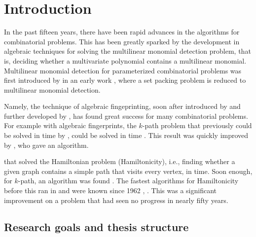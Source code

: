 
\section{Introduction}

In the past fifteen years, 
there have been rapid advances in the algorithms for combinatorial problems. 
This has been greatly sparked by the development in algebraic techniques for solving the 
multilinear monomial detection problem, that is, 
deciding whether a multivariate polynomial contains a multilinear monomial.
Multilinear monomial detection for parameterized combinatorial problems was 
first introduced by \citeauthor{Koutis05} in an early work 
\cite{Koutis05}, where a set packing problem is 
reduced to multilinear monomial detection.

Namely, the technique of algebraic fingeprinting, soon after  
introduced by \citeauthor{Koutis08} \cite{Koutis08} and further developed by 
\citeauthor{Williams09} \cite{Williams09}, 
has found great success for many combinatorial problems. 
For example with algebraic fingerprints, the $k$-path problem 
that previously could be solved in  time by \citeauthor{Chen07} \cite{Chen07}, 
could be solved in  time \cite{Koutis08}. 
This result was quickly improved by \cite{Williams09} \cite{Williams09}, 
who gave an  algorithm.

that solved the Hamiltonian problem (Hamiltonicity), i.e., finding whether a given graph contains a simple path that visits 
every vertex, in  time. Soon enough, for $k$-path, an  algorithm was found \cite{Björklund17}. 
The fastest algorithms for Hamiltonicity before this ran in
and were known since 1962 \cite{HelKar62}, \cite{Bellman62}.
This was a significant improvement on a problem that had seen no progress in nearly fifty years.

\subsection{Research goals and thesis structure}

